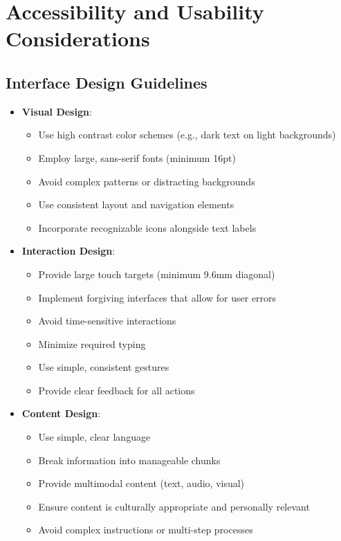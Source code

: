 \section{Accessibility and Usability Considerations}
\subsection{Interface Design Guidelines}
\begin{itemize}
    \item \textbf{Visual Design}:
    \begin{itemize}
        \item Use high contrast color schemes (e.g., dark text on light backgrounds)
        \item Employ large, sans-serif fonts (minimum 16pt)
        \item Avoid complex patterns or distracting backgrounds
        \item Use consistent layout and navigation elements
        \item Incorporate recognizable icons alongside text labels
    \end{itemize}
    
    \item \textbf{Interaction Design}:
    \begin{itemize}
        \item Provide large touch targets (minimum 9.6mm diagonal)
        \item Implement forgiving interfaces that allow for user errors
        \item Avoid time-sensitive interactions
        \item Minimize required typing
        \item Use simple, consistent gestures
        \item Provide clear feedback for all actions
    \end{itemize}
    
    \item \textbf{Content Design}:
    \begin{itemize}
        \item Use simple, clear language
        \item Break information into manageable chunks
        \item Provide multimodal content (text, audio, visual)
        \item Ensure content is culturally appropriate and personally relevant
        \item Avoid complex instructions or multi-step processes
    \end{itemize}
\end{itemize}

